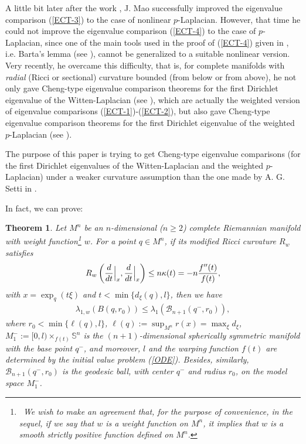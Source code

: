 \documentclass[12pt]{article}
\newtheorem{theorem}{Theorem}[section]
\begin{document}
A little bit later after the work \cite{FMI}, J. Mao \cite[Theorem
3.2]{JM4} successfully improved the eigenvalue comparison
(\ref{ECT-3}) to the case of nonlinear $p$-Laplacian. However, that
time he could not improve the eigenvalue comparison (\ref{ECT-4}) to
the case of
 $p$-Laplacian, since one of the main tools used in the proof of
 (\ref{ECT-4}) given in \cite{FMI}, i.e. Barta's lemma (see
 \cite{JB}), cannot be generalized to a suitable nonlinear version.
Very recently, he overcame this difficulty, that is, for complete
manifolds with \emph{radial} (Ricci or sectional) curvature bounded
(from below or from above), he not only gave Cheng-type eigenvalue
comparison theorems for the first Dirichlet eigenvalue of the
Witten-Laplacian (see \cite[Theorems 1.17 and 1.18]{JM-1}), which
are actually the weighted version of eigenvalue comparisons
(\ref{ECT-1})-(\ref{ECT-2}), but also gave Cheng-type eigenvalue
comparison theorems for the first Dirichlet eigenvalue of the
weighted $p$-Laplacian (see \cite[Theorems 6.6 and 7.3]{JM-1}).

 The purpose of this
paper is trying to get Cheng-type eigenvalue comparisons (for the
first Dirichlet eigenvalues of the Witten-Laplacian and the weighted
$p$-Laplacian) under a weaker curvature assumption than the one made
by A. G. Setti in \cite{SAG}.

In fact, we can prove:

\begin{theorem} \label{maintheorem1}
Let $M^n$ be an $n$-dimensional ($n\geq2$) complete Riemannian
manifold with weight function\footnote{~We wish to make an agreement
that, for the purpose of convenience, in the sequel, if we say that
$w$ is a weight function on $M^n$, it implies that $w$ is a smooth
strictly positive function defined on $M^n$.} $w$. For a point $q\in
M^n$, if its modified Ricci curvature $R_{w}$ satisfies
\begin{eqnarray} \label{CS-1}
R_{w}\left(\frac{d}{dt}\Big{|}_{x},\frac{d}{dt}\Big{|}_{x}\right)\leq
n\kappa(t)=-n\frac{f''(t)}{f(t)},
\end{eqnarray}
with $x=\exp_{q}(t\xi)$ and $t<\min\{d_{\xi}(q),l\}$, then we have
\begin{eqnarray} \label{ECT-5}
\lambda_{1,w}(B(q,r_0))\leq\lambda_{1}(\mathscr{B}_{n+1}(q^{-},r_0)),
\end{eqnarray}
where $r_{0}<\min\{\ell(q),l\}$,
$\ell(q):=\sup_{M^n}r(x)=\max_{\xi}d_{\xi}$,
$M^{-}_{1}:=[0,l)\times_{f(t)}\mathbb{S}^n$ is the
$(n+1)$-dimensional spherically symmetric manifold with the base
point $q^{-}$, and moreover, $l$ and the warping function $f(t)$ are
determined by the initial value problem (\ref{ODE}). Besides,
similarly, $\mathscr{B}_{n+1}(q^{-},r_0)$ is the geodesic ball, with
center $q^{-}$ and radius $r_0$, on the model space $M^{-}_{1}$.
\end{theorem}
\end{document}
